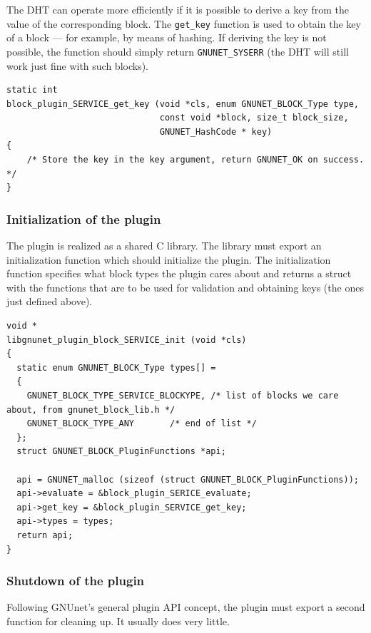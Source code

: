 \documentclass[10pt]{article}
\begin{document}
The DHT can operate more efficiently if it is possible to derive a key
from the value of the corresponding block.  The {\tt get\_key}
function is used to obtain the key of a block --- for example, by
means of hashing.  If deriving the key is not possible, the function
should simply return {\tt GNUNET\_SYSERR} (the DHT will still work
just fine with such blocks).

\lstset{language=C}
\begin{lstlisting}
static int
block_plugin_SERVICE_get_key (void *cls, enum GNUNET_BLOCK_Type type,
                              const void *block, size_t block_size,
                              GNUNET_HashCode * key)
{
    /* Store the key in the key argument, return GNUNET_OK on success. */
}
\end{lstlisting}

\subsubsection{Initialization of the plugin}

The plugin is realized as a shared C library.  The library must export
an initialization function which should initialize the plugin.  The
initialization function specifies what block types the plugin cares
about and returns a struct with the functions that are to be used for
validation and obtaining keys (the ones just defined above).

\lstset{language=C}
\begin{lstlisting}
void *
libgnunet_plugin_block_SERVICE_init (void *cls)
{
  static enum GNUNET_BLOCK_Type types[] =
  {
    GNUNET_BLOCK_TYPE_SERVICE_BLOCKYPE, /* list of blocks we care about, from gnunet_block_lib.h */
    GNUNET_BLOCK_TYPE_ANY       /* end of list */
  };
  struct GNUNET_BLOCK_PluginFunctions *api;

  api = GNUNET_malloc (sizeof (struct GNUNET_BLOCK_PluginFunctions));
  api->evaluate = &block_plugin_SERICE_evaluate;
  api->get_key = &block_plugin_SERVICE_get_key;
  api->types = types;
  return api;
}
\end{lstlisting}

\subsubsection{Shutdown of the plugin}

Following GNUnet's general plugin API concept, the plugin must 
export a second function for cleaning up.  It usually does very
little.
\end{document}
